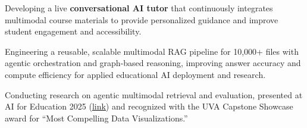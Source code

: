 \documentclass[letterpaper,11pt]{article}
\newcommand{\resumeItem}[1]{
  \item{\small{#1}}
}
\begin{document}
    
    


        \resumeItem{Developing a live \textbf{conversational AI tutor} that continuously integrates multimodal course materials to provide personalized guidance and improve student engagement and accessibility.}
        

        \resumeItem{Engineering a reusable, scalable multimodal RAG pipeline for 10,000+ files with agentic orchestration and graph-based reasoning, improving answer accuracy and compute efficiency for applied educational AI deployment and research.}
        
        \resumeItem{Conducting research on agentic multimodal retrieval and evaluation, presented at AI for Education 2025 (\href{\paperlink}{\underline{link}}) and recognized with the UVA Capstone Showcase award for “Most Compelling Data Visualizations.”}
\end{document}
